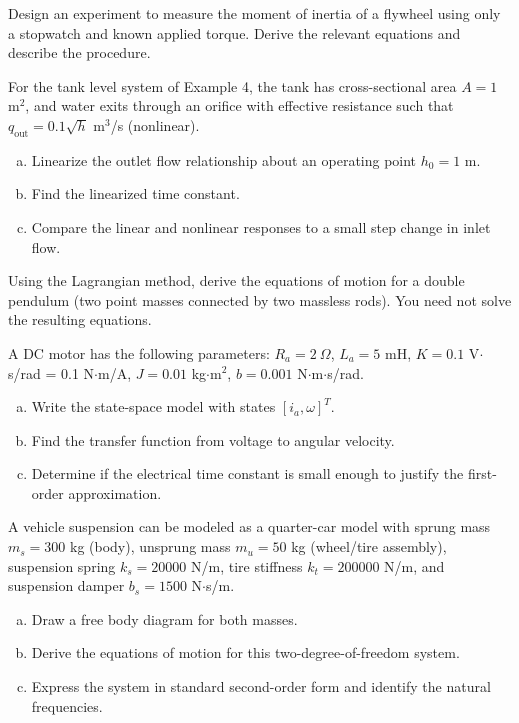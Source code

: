 \begin{exercise}
Design an experiment to measure the moment of inertia of a flywheel using only a stopwatch and known applied torque. Derive the relevant equations and describe the procedure.
\end{exercise}

\begin{exercise}
For the tank level system of Example 4, the tank has cross-sectional area $A = 1$ m$^2$, and water exits through an orifice with effective resistance such that $q_{\text{out}} = 0.1\sqrt{h}$ m$^3$/s (nonlinear).
\begin{enumerate}[(a)]
    \item Linearize the outlet flow relationship about an operating point $h_0 = 1$ m.
    \item Find the linearized time constant.
    \item Compare the linear and nonlinear responses to a small step change in inlet flow.
\end{enumerate}
\end{exercise}

\begin{exercise}
Using the Lagrangian method, derive the equations of motion for a double pendulum (two point masses connected by two massless rods). You need not solve the resulting equations.
\end{exercise}

\begin{exercise}
A DC motor has the following parameters: $R_a = 2\ \Omega$, $L_a = 5$ mH, $K = 0.1$ V$\cdot$s/rad = 0.1 N$\cdot$m/A, $J = 0.01$ kg$\cdot$m$^2$, $b = 0.001$ N$\cdot$m$\cdot$s/rad.
\begin{enumerate}[(a)]
    \item Write the state-space model with states $[i_a, \omega]^T$.
    \item Find the transfer function from voltage to angular velocity.
    \item Determine if the electrical time constant is small enough to justify the first-order approximation.
\end{enumerate}
\end{exercise}

\begin{exercise}
A vehicle suspension can be modeled as a quarter-car model with sprung mass $m_s = 300$ kg (body), unsprung mass $m_u = 50$ kg (wheel/tire assembly), suspension spring $k_s = 20000$ N/m, tire stiffness $k_t = 200000$ N/m, and suspension damper $b_s = 1500$ N$\cdot$s/m.
\begin{enumerate}[(a)]
    \item Draw a free body diagram for both masses.
    \item Derive the equations of motion for this two-degree-of-freedom system.
    \item Express the system in standard second-order form and identify the natural frequencies.
\end{enumerate}
\end{exercise}

